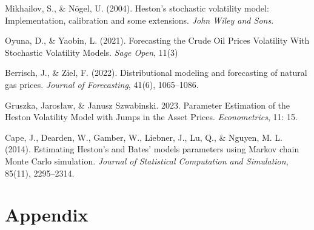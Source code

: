 \documentclass[12pt,a4paper]{article}
\numberwithin{equation}{section}
\begin{document}
\begin{thebibliography}{11}
\bibitem{}
Mikhailov, S., \& Nögel, U. (2004). Heston’s stochastic volatility model: Implementation, calibration and some extensions. \emph{John Wiley and Sons}.

\bibitem{}
Oyuna, D., \& Yaobin, L. (2021). Forecasting the Crude Oil Prices Volatility With Stochastic Volatility Models. \emph{Sage Open}, 11(3)

\bibitem{}
Berrisch, J., \& Ziel, F. (2022). Distributional modeling and forecasting of natural gas prices. \emph{Journal of Forecasting}, 41(6), 1065–1086. 


\bibitem{}
Gruszka, Jarosław, \& Janusz Szwabinski. 2023. Parameter Estimation of the Heston Volatility Model with Jumps in the Asset Prices. \emph{Econometrics}, 11: 15.

\bibitem{}
Cape, J., Dearden, W., Gamber, W., Liebner, J., Lu, Q., \& Nguyen, M. L. (2014). Estimating Heston’s and Bates’ models parameters using Markov chain Monte Carlo simulation. \emph{Journal of Statistical Computation and Simulation}, 85(11), 2295–2314. 





\end{thebibliography}
\newpage
\section*{Appendix}



 


%
%



\setcounter{equation}{0}
\renewcommand\theequation{\Alph{section}.\arabic{equation}}	
\setcounter{table}{0}
\renewcommand\thetable{\Alph{section}.\arabic{table}}
\setcounter{figure}{0}
\renewcommand\thefigure{\Alph{section}.\arabic{figure}}
\end{document}
